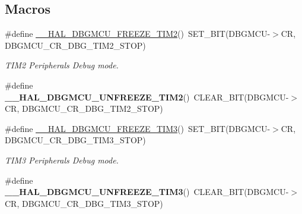 \subsection*{Macros}
\begin{DoxyCompactItemize}
\item 
\mbox{\label{group___d_b_g_m_c_u___freeze___unfreeze_ga4a466905a367266e7c23417248dc741d}} 
\#define \hyperlink{group___d_b_g_m_c_u___freeze___unfreeze_ga4a466905a367266e7c23417248dc741d}{\+\_\+\+\_\+\+H\+A\+L\+\_\+\+D\+B\+G\+M\+C\+U\+\_\+\+F\+R\+E\+E\+Z\+E\+\_\+\+T\+I\+M2}()~S\+E\+T\+\_\+\+B\+IT(D\+B\+G\+M\+CU-\/$>$CR, D\+B\+G\+M\+C\+U\+\_\+\+C\+R\+\_\+\+D\+B\+G\+\_\+\+T\+I\+M2\+\_\+\+S\+T\+OP)
\begin{DoxyCompactList}\small\item\em T\+I\+M2 Peripherals Debug mode. \end{DoxyCompactList}\item 
\mbox{\label{group___d_b_g_m_c_u___freeze___unfreeze_gafd40134436233985a840e1cd8eb6c4c3}} 
\#define {\bfseries \+\_\+\+\_\+\+H\+A\+L\+\_\+\+D\+B\+G\+M\+C\+U\+\_\+\+U\+N\+F\+R\+E\+E\+Z\+E\+\_\+\+T\+I\+M2}()~C\+L\+E\+A\+R\+\_\+\+B\+IT(D\+B\+G\+M\+CU-\/$>$CR, D\+B\+G\+M\+C\+U\+\_\+\+C\+R\+\_\+\+D\+B\+G\+\_\+\+T\+I\+M2\+\_\+\+S\+T\+OP)
\item 
\mbox{\label{group___d_b_g_m_c_u___freeze___unfreeze_gaf2fe2b6d0a5e8df4ebb38020acf210d9}} 
\#define \hyperlink{group___d_b_g_m_c_u___freeze___unfreeze_gaf2fe2b6d0a5e8df4ebb38020acf210d9}{\+\_\+\+\_\+\+H\+A\+L\+\_\+\+D\+B\+G\+M\+C\+U\+\_\+\+F\+R\+E\+E\+Z\+E\+\_\+\+T\+I\+M3}()~S\+E\+T\+\_\+\+B\+IT(D\+B\+G\+M\+CU-\/$>$CR, D\+B\+G\+M\+C\+U\+\_\+\+C\+R\+\_\+\+D\+B\+G\+\_\+\+T\+I\+M3\+\_\+\+S\+T\+OP)
\begin{DoxyCompactList}\small\item\em T\+I\+M3 Peripherals Debug mode. \end{DoxyCompactList}\item 
\mbox{\label{group___d_b_g_m_c_u___freeze___unfreeze_ga5aecefa008a37ef7c6489a2e29415e69}} 
\#define {\bfseries \+\_\+\+\_\+\+H\+A\+L\+\_\+\+D\+B\+G\+M\+C\+U\+\_\+\+U\+N\+F\+R\+E\+E\+Z\+E\+\_\+\+T\+I\+M3}()~C\+L\+E\+A\+R\+\_\+\+B\+IT(D\+B\+G\+M\+CU-\/$>$CR, D\+B\+G\+M\+C\+U\+\_\+\+C\+R\+\_\+\+D\+B\+G\+\_\+\+T\+I\+M3\+\_\+\+S\+T\+OP)

\end{DoxyCompactItemize}
